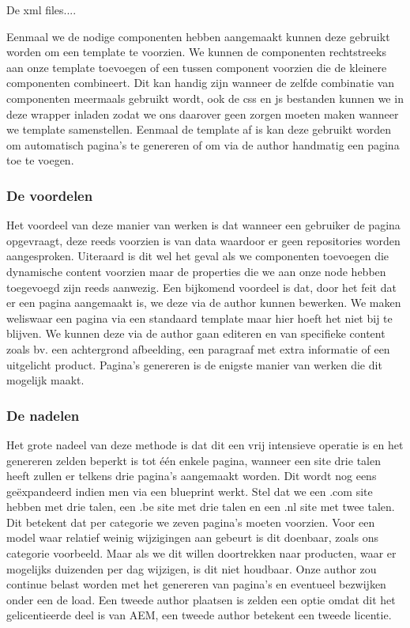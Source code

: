 \documentclass{article}
\begin{document}
    \par
    De xml files....
    \par
    Eenmaal we de nodige componenten hebben aangemaakt kunnen deze gebruikt worden om een template te voorzien. We kunnen de componenten rechtstreeks aan onze template toevoegen of een tussen component voorzien die de kleinere componenten combineert. Dit kan handig zijn wanneer de zelfde combinatie van componenten meermaals gebruikt wordt, ook de css en js bestanden kunnen we in deze wrapper inladen zodat we ons daarover geen zorgen moeten maken wanneer we template samenstellen. Eenmaal de template af is kan deze gebruikt worden om automatisch pagina's te genereren of om via de author handmatig een pagina toe te voegen.
	\subsubsection{De voordelen}
    Het voordeel van deze manier van werken is dat wanneer een gebruiker de pagina opgevraagt, deze reeds voorzien is van data waardoor er geen repositories worden aangesproken. Uiteraard is dit wel het geval als we componenten toevoegen die dynamische content voorzien maar de properties die we aan onze node hebben toegevoegd zijn reeds aanwezig. Een bijkomend voordeel is dat, door het feit dat er een pagina aangemaakt is, we deze via de author kunnen bewerken. We maken weliswaar een pagina via een standaard template maar hier hoeft het niet bij te blijven. We kunnen deze via de author gaan editeren en van specifieke content zoals bv. een achtergrond afbeelding, een paragraaf met extra informatie of een uitgelicht product. Pagina's genereren is de enigste manier van werken die dit mogelijk maakt.
	\subsubsection{De nadelen}
    Het grote nadeel van deze methode is dat dit een vrij intensieve operatie is en het genereren zelden beperkt is tot één enkele pagina, wanneer een site drie talen heeft zullen er telkens drie pagina's aangemaakt worden. Dit wordt nog eens geëxpandeerd indien men via een blueprint werkt. Stel dat we een .com site hebben met drie talen, een .be site met drie talen en een .nl site met twee talen. Dit betekent dat per categorie we zeven pagina's moeten voorzien. Voor een model waar relatief weinig wijzigingen aan gebeurt is dit doenbaar, zoals ons categorie voorbeeld. Maar als we dit willen doortrekken naar producten, waar er mogelijks duizenden per dag wijzigen, is dit niet houdbaar. Onze author zou continue belast worden met het genereren van pagina's en eventueel bezwijken onder een de load. Een tweede author plaatsen is zelden een optie omdat dit het gelicentieerde deel is van AEM, een tweede author betekent een tweede licentie.
\end{document}
